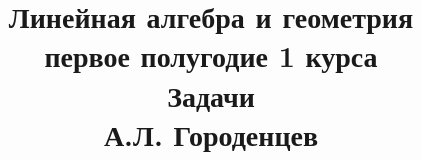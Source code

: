 \documentclass[fleqn]{article}
\title{Линейная алгебра и геометрия \\ первое полугодие 1 курса \\ Задачи \\ А.Л. Городенцев}
\begin{document}
	\maketitle
	\pagebreak
	
	
	\tableofcontents
	
	\newpage
	
	
	
	
	
	
	
			
\end{document}
